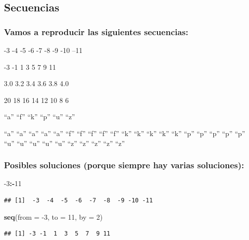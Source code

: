 \documentclass[
]{book}
\newenvironment{Shaded}{\begin{snugshade}}{\end{snugshade}}
\newcommand{\DataTypeTok}[1]{\textcolor[rgb]{0.13,0.29,0.53}{#1}}
\newcommand{\DecValTok}[1]{\textcolor[rgb]{0.00,0.00,0.81}{#1}}
\newcommand{\KeywordTok}[1]{\textcolor[rgb]{0.13,0.29,0.53}{\textbf{#1}}}
\newcommand{\NormalTok}[1]{#1}
\newcommand{\OperatorTok}[1]{\textcolor[rgb]{0.81,0.36,0.00}{\textbf{#1}}}
\begin{document}
\hypertarget{secuencias}{%
\subsection{Secuencias}\label{secuencias}}

\hypertarget{vamos-a-reproducir-las-siguientes-secuencias}{%
\subsubsection{Vamos a reproducir las siguientes secuencias:}\label{vamos-a-reproducir-las-siguientes-secuencias}}

-3 -4 -5 -6 -7 -8 -9 -10 --11

-3 -1 1 3 5 7 9 11

3.0 3.2 3.4 3.6 3.8 4.0

20 18 16 14 12 10 8 6

``a'' ``f'' ``k'' ``p'' ``u'' ``z''

``a'' ``a'' ``a'' ``a'' ``a'' ``f'' ``f'' ``f'' ``f'' ``f'' ``k'' ``k'' ``k'' ``k'' ``k'' ``p'' ``p'' ``p'' ``p'' ``p'' ``u'' ``u'' ``u'' ``u'' ``u'' ``z'' ``z'' ``z'' ``z'' ``z''

\hypertarget{posibles-soluciones-porque-siempre-hay-varias-soluciones}{%
\subsubsection{Posibles soluciones (porque siempre hay varias soluciones):}\label{posibles-soluciones-porque-siempre-hay-varias-soluciones}}

\begin{Shaded}
\begin{Highlighting}[]
\DecValTok{-3}\OperatorTok{:-}\DecValTok{11}
\end{Highlighting}
\end{Shaded}

\begin{verbatim}
## [1]  -3  -4  -5  -6  -7  -8  -9 -10 -11
\end{verbatim}

\begin{Shaded}
\begin{Highlighting}[]
\KeywordTok{seq}\NormalTok{(}\DataTypeTok{from =} \DecValTok{-3}\NormalTok{, }\DataTypeTok{to =} \DecValTok{11}\NormalTok{, }\DataTypeTok{by =} \DecValTok{2}\NormalTok{)}
\end{Highlighting}
\end{Shaded}

\begin{verbatim}
## [1] -3 -1  1  3  5  7  9 11
\end{verbatim}
\end{document}
